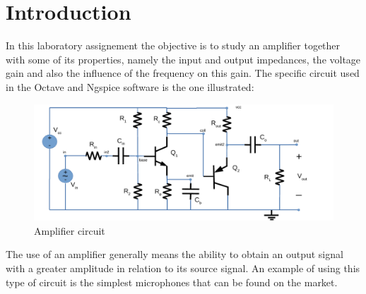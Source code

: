 \section{Introduction}
\label{sec:intro}


\par In this laboratory assignement the objective is to study an amplifier together with some of its properties, namely the input and output impedances, the voltage gain and also the influence of the frequency on this gain. The specific circuit used in the Octave and Ngspice software is the one illustrated:


\begin{figure} [!htb] 
  \includegraphics[width=\linewidth]{circuit.pdf}
  \caption{Amplifier circuit}
  \label{fig:theoplots}
  \endminipage\hfill
\end{figure}


\par The use of an amplifier generally means the ability to obtain an output signal with a greater amplitude in relation to its source signal. An example of using this type of circuit is the simplest microphones that can be found on the market.


